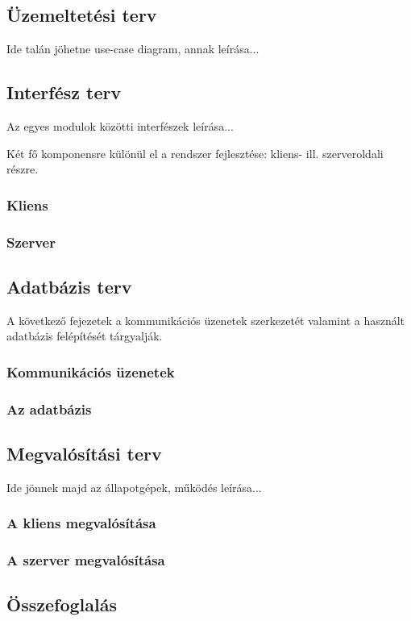 \subsection{Üzemeltetési terv}
\label{sec:uzemeltetesi_terv}

Ide talán jöhetne use-case diagram, annak leírása...

\subsection{Interfész terv}
\label{sec:interfesz_terv}

Az egyes modulok közötti interfészek leírása...

Két fő komponensre különül el a rendszer fejlesztése: kliens-
ill. szerveroldali részre.

\subsubsection{Kliens}
\label{sec:kliensinterfesz}

\subsubsection{Szerver}
\label{sec:szerverinterfesz}

\subsection{Adatbázis terv}

A következő fejezetek a kommunikációs üzenetek szerkezetét valamint a használt adatbázis felépítését tárgyalják.


\subsubsection{Kommunikációs üzenetek}
\label{sec:kommuzenetek}

\subsubsection{Az adatbázis}
\label{sec:adatb}

\subsection{Megvalósítási terv}
\label{sec:megvalositas}

Ide jönnek majd az állapotgépek, működés leírása...

\subsubsection{A kliens megvalósítása}

\subsubsection{A szerver megvalósítása}
\label{sec:szervermegvalositas}


\subsection{Összefoglalás}

